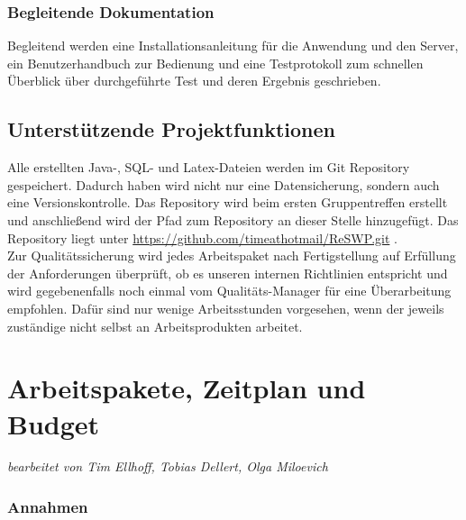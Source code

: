 \documentclass[fontsize=12pt,paper=a4,twoside]{scrartcl}
\begin{document}
\subsubsection{Begleitende Dokumentation}

Begleitend werden eine Installationsanleitung für die Anwendung und den Server, ein Benutzerhandbuch zur Bedienung und eine Testprotokoll zum schnellen Überblick über durchgeführte Test und deren Ergebnis geschrieben.

\subsection{Unterstützende Projektfunktionen}

Alle erstellten Java-, SQL- und Latex-Dateien werden im Git Repository gespeichert. Dadurch haben wird nicht nur eine Datensicherung, sondern auch eine Versionskontrolle. Das Repository wird beim ersten Gruppentreffen erstellt und anschließend wird der Pfad zum Repository an dieser Stelle hinzugefügt. Das Repository liegt unter \url{https://github.com/timeathotmail/ReSWP.git} .\\
Zur Qualitätssicherung wird jedes Arbeitspaket nach Fertigstellung auf Erfüllung der Anforderungen überprüft, ob es unseren internen Richtlinien entspricht und wird gegebenenfalls noch einmal vom Qualitäts-Manager für eine Überarbeitung empfohlen. Dafür sind nur wenige Arbeitsstunden vorgesehen, wenn der jeweils zuständige nicht selbst an Arbeitsprodukten arbeitet.



\section{Arbeitspakete, Zeitplan und Budget}

\textit{bearbeitet von Tim Ellhoff, Tobias Dellert, Olga Miloevich}

\subsubsection{Annahmen}\label{aps}
\end{document}
